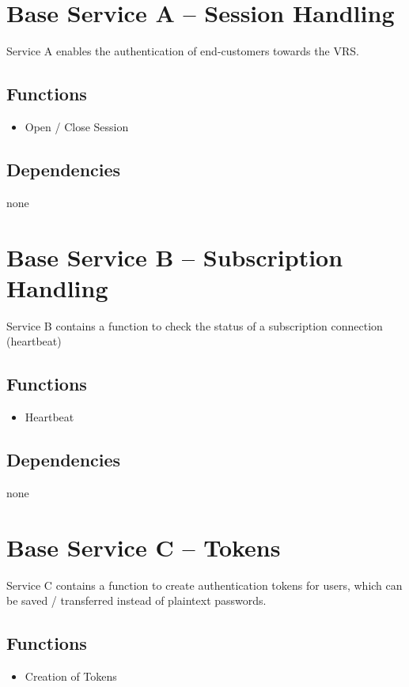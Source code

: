 \section{Base Service A -- Session Handling}
\label{sec:Hierachiemodell:BasisdienstA}
Service A enables the authentication of end-customers towards the VRS.

\subsection*{Functions}
\begin{itemize}
\item Open / Close Session
\end{itemize}

\subsection*{Dependencies}
none

\section{Base Service B -- Subscription Handling}
\label{sec:Hierachiemodell:BasisdienstB}
Service B contains a function to check the status of a subscription connection (heartbeat)

\subsection*{Functions}
\begin{itemize}
\item Heartbeat
\end{itemize}

\subsection*{Dependencies}
none

\section{Base Service C -- Tokens}
\label{sec:Hierachiemodell:BasisdienstC}
Service C contains a function to create authentication tokens for users, which can be saved / transferred instead of plaintext passwords.

\subsection*{Functions}
\begin{itemize}
\item Creation of Tokens
\end{itemize}

